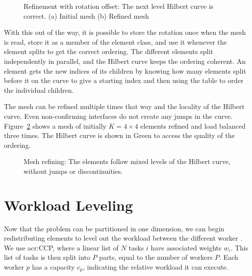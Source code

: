 \begin{figure}[H]
	\centering
	\hfill
	\caption{Refinement with rotation offset: The next level Hilbert curve is correct. (a) Initial mesh (b) Refined mesh}\label{fig:hilbert_correct}
\end{figure}

With this out of the way, it is possible to store the rotation once when the mesh is read, store it
as a member of the element class, and use it whenever the element splits to get the correct
ordering. The different elements split independently in parallel, and the Hilbert curve keeps the
ordering coherent. An element gets the new indices of its children by knowing how many elements
split before it on the curve to give a starting index and then using the table to order the
individual children.

The mesh can be refined multiple times that way and the locality of the Hilbert curve. Even
non-confirming interfaces do not create any jumps in the curve. Figure~\ref{fig:mesh_1_after2} shows
a mesh of initially \(K = 4 \times 4\) elements refined and load balanced three times. The Hilbert
curve is shown in Green to access the quality of the ordering.

\begin{figure}[H]
	\centering
	
	\caption{Mesh refining: The elements follow mixed levels of the Hilbert curve, without jumps or discontinuities.}\label{fig:mesh_1_after2}
\end{figure}

\section{Workload Leveling}\label{section:load_balancing:workload_leveling}

Now that the problem can be partitioned in one dimension, we can begin redistributing elements to
level out the workload between the different worker . We use \acrlong{acr:CCP},
where a linear list of \(N\) tasks \(i\) have associated weights \(w_i\). This list of tasks is then
split into \(P\) parts, equal to the number of workers \(P\). Each worker \(p\) has a capacity
\(c_p\), indicating the relative workload it can execute.

